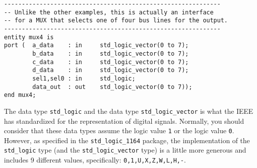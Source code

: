 \noindent
\begin{minipage}{0.99\linewidth}
\vspace{5pt}
\centering
{}
\begin{lstlisting}[label=entity_3, caption=Entity declaration with bundles.]
-------------------------------------------------------------
-- Unlike the other examples, this is actually an interface
-- for a MUX that selects one of four bus lines for the output.
-------------------------------------------------------------
entity mux4 is
port (  a_data    : in     std_logic_vector(0 to 7);
        b_data    : in     std_logic_vector(0 to 7);
        c_data    : in     std_logic_vector(0 to 7);
        d_data    : in     std_logic_vector(0 to 7);
        sel1,sel0 : in     std_logic;
        data_out  : out    std_logic_vector(0 to 7));
end mux4;
\end{lstlisting}
\end{minipage}

The data type \texttt{std\_logic} and the data type \texttt{std\_logic\_vector} is what the IEEE has standardized for the representation of digital signals. Normally, you should consider that these data types assume the logic value \texttt{1} or the logic value \texttt{0}. However, as specified in the \texttt{std\_logic\_1164} package, the implementation of the \texttt{std\_logic} type (and the \texttt{std\_logic\_vector} type) is a little more generous and includes 9 different values, specifically: \texttt{0,1,U,X,Z,W,L,H,-}. 

